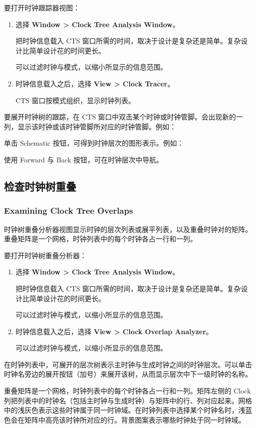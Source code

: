 要打开时钟跟踪器视图：
\begin{enumerate}
  \item 选择 \textbf{Window > Clock Tree Analysis Window}。

  把时钟信息载入 CTS 窗口所需的时间，取决于设计是复杂还是简单。复杂设计比简单设计花的时间更长。

  可以过滤时钟与模式，以缩小所显示的信息范围。
  \item 时钟信息载入之后，选择 \textbf{View > Clock Tracer}。

  CTS 窗口按模式组织，显示时钟列表。
\end{enumerate}

要展开时钟树的跟踪，在 CTS 窗口中双击某个时钟或时钟管脚。会出现新的一列，显示该时钟或该时钟管脚所对应的时钟管脚。例如：

单击 Schematic 按钮，可得到时钟层次的图形表示。例如：

使用 Forward 与 Back 按钮，可在时钟层次中导航。

\subsection{检查时钟树重叠}
\subsubsection*{Examining Clock Tree Overlaps}

时钟树重叠分析器视图显示时钟的层次列表或展平列表，以及重叠时钟对的矩阵。重叠矩阵是一个网格，时钟列表中的每个时钟各占一行和一列。

要打开时钟树重叠分析器：
\begin{enumerate}
  \item 选择 \textbf{Window > Clock Tree Analysis Window}。

  把时钟信息载入 CTS 窗口所需的时间，取决于设计是复杂还是简单。复杂设计比简单设计花的时间更长。

  可以过滤时钟与模式，以缩小所显示的信息范围。
  \item 时钟信息载入之后，选择 \textbf{View > Clock Overlap Analyzer}。

  可以过滤时钟与模式，以缩小所显示的信息范围。
\end{enumerate}

在时钟列表中，可展开的层次树表示主时钟与生成时钟之间的时钟层次。可以单击时钟名旁边的展开按钮（加号）来展开该树，从而显示层次中下一级时钟的名称。

重叠矩阵是一个网格，时钟列表中的每个时钟各占一行和一列。矩阵左侧的 Clock 列把列表中的时钟名（包括主时钟与生成时钟）与矩阵中的行、列对应起来。网格中的浅灰色表示这些时钟属于同一时钟域。在时钟列表中选择某个时钟名时，浅蓝色会在矩阵中高亮该时钟所对应的行。背景图案表示哪些时钟处于同一时钟域。


